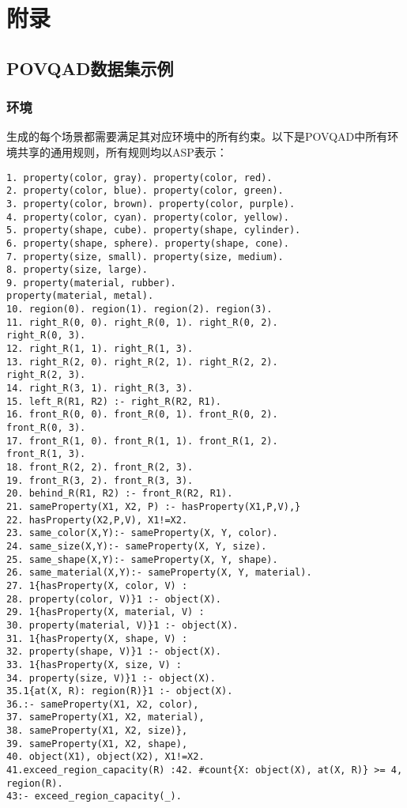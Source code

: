 \chapter{附录}
\section{POVQAD数据集示例}
\subsection{环境}
\label{appendix:environment}
生成的每个场景都需要满足其对应环境中的所有约束。以下是POVQAD中所有环境共享的通用规则，所有规则均以ASP表示：
\begin{lstlisting}
1. property(color, gray). property(color, red).
2. property(color, blue). property(color, green).
3. property(color, brown). property(color, purple).
4. property(color, cyan). property(color, yellow).
5. property(shape, cube). property(shape, cylinder).
6. property(shape, sphere). property(shape, cone).
7. property(size, small). property(size, medium).
8. property(size, large).
9. property(material, rubber).
property(material, metal).
10. region(0). region(1). region(2). region(3).
11. right_R(0, 0). right_R(0, 1). right_R(0, 2).
right_R(0, 3).
12. right_R(1, 1). right_R(1, 3).
13. right_R(2, 0). right_R(2, 1). right_R(2, 2).
right_R(2, 3).
14. right_R(3, 1). right_R(3, 3).
15. left_R(R1, R2) :- right_R(R2, R1).
16. front_R(0, 0). front_R(0, 1). front_R(0, 2).
front_R(0, 3).
17. front_R(1, 0). front_R(1, 1). front_R(1, 2).
front_R(1, 3).
18. front_R(2, 2). front_R(2, 3).
19. front_R(3, 2). front_R(3, 3).
20. behind_R(R1, R2) :- front_R(R2, R1).
21. sameProperty(X1, X2, P) :- hasProperty(X1,P,V),}
22. hasProperty(X2,P,V), X1!=X2.
23. same_color(X,Y):- sameProperty(X, Y, color).
24. same_size(X,Y):- sameProperty(X, Y, size).
25. same_shape(X,Y):- sameProperty(X, Y, shape).
26. same_material(X,Y):- sameProperty(X, Y, material).
27. 1{hasProperty(X, color, V) :
28. property(color, V)}1 :- object(X).
29. 1{hasProperty(X, material, V) :
30. property(material, V)}1 :- object(X).
31. 1{hasProperty(X, shape, V) :
32. property(shape, V)}1 :- object(X).
33. 1{hasProperty(X, size, V) :
34. property(size, V)}1 :- object(X).
35.1{at(X, R): region(R)}1 :- object(X).
36.:- sameProperty(X1, X2, color),
37. sameProperty(X1, X2, material),
38. sameProperty(X1, X2, size)},
39. sameProperty(X1, X2, shape),
40. object(X1), object(X2), X1!=X2.
41.exceed_region_capacity(R) :42. #count{X: object(X), at(X, R)} >= 4, region(R).
43:- exceed_region_capacity(_).
\end{lstlisting}
